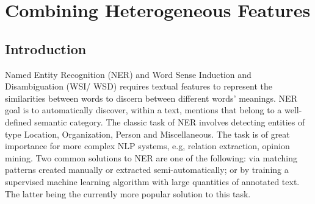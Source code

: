 \section{Combining Heterogeneous Features}
\label{chap:fusion}


\subsection{Introduction}
Named Entity Recognition (NER) and Word Sense Induction and Disambiguation (WSI/ \allowbreak WSD) requires textual features to represent the similarities between words to discern between different words' meanings. NER goal is to automatically discover, within a text, mentions that belong to a well-defined semantic category. The classic task of NER involves detecting entities of type Location, Organization, Person and Miscellaneous. The task is of great importance for more complex NLP systems, e.g, relation extraction, opinion mining. Two common solutions to NER are one of the following: via matching patterns created manually or extracted semi-automatically; or by training a supervised machine learning algorithm with large quantities of annotated text. The latter being the currently more popular solution to this task.






